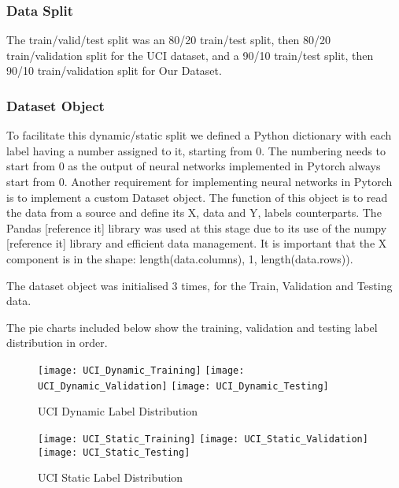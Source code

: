    \subsubsection{Data Split}
        The train/valid/test split was an 80/20 train/test split, then 80/20 train/validation split for the UCI dataset, and a 90/10 train/test split, then 90/10 train/validation split for Our Dataset.
    \subsubsection{Dataset Object}
        To facilitate this dynamic/static split we defined a Python dictionary with each label having a number assigned to it, starting from 0.
        The numbering needs to start from 0 as the output of neural networks implemented in Pytorch always start from 0.
        Another requirement for implementing neural networks in Pytorch is to implement a custom Dataset object.
        The function of this object is to read the data from a source and define its X, data and Y, labels counterparts.
        The Pandas [reference it] library was used at this stage due to its use of the numpy [reference it] library and efficient data management.
        It is important that the X component is in the shape: length(data.columns), 1, length(data.rows)).

        The dataset object was initialised 3 times, for the Train, Validation and Testing data.

        The pie charts included below show the training, validation and testing label distribution in order.

        \begin{figure}[htp]
        \centering
        \texttt{[image: UCI\_Dynamic\_Training]}\hfill
        \texttt{[image: UCI\_Dynamic\_Validation]}\hfill
        \texttt{[image: UCI\_Dynamic\_Testing]}
        \caption{UCI Dynamic Label Distribution}
        \label{fig:figureX}
        \end{figure}

        \begin{figure}[htp]
        \centering
        \texttt{[image: UCI\_Static\_Training]}\hfill
        \texttt{[image: UCI\_Static\_Validation]}\hfill
        \texttt{[image: UCI\_Static\_Testing]}
        \caption{UCI Static Label Distribution}
        \label{fig:figureX}
        \end{figure}

